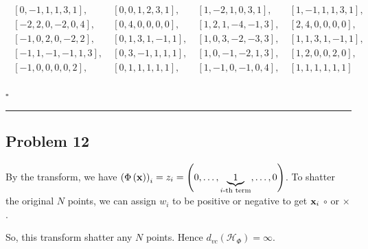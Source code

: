 \documentclass[12pt]{article}
\newcommand*{\QEDB}{\hfill\ensuremath{\square}}
\newcommand{\CBrackets}[1]{\left\{#1\right\}}
\newcommand{\ParTh}[1]{\left(#1\right)}
\newcommand{\BF}[1]{{\bf#1}}
\newcommand{\horrule}[1]{\rule{\linewidth}{#1}}
\begin{document}
\begin{align}
\begin{array}{llll}
\left[ 0, -1,  1,  1,  3,  1\right],~&\left[ 0,  0,  1,  2,  3,  1\right],~&\left[ 1, -2,  1,  0,  3,  1\right],~&\left[ 1, -1,  1,  1,  3,  1\right],\\
\left[-2,  2,  0, -2,  0,  4\right],~&\left[ 0,  4,  0,  0,  0,  0\right],~&\left[ 1,  2,  1, -4, -1,  3\right],~&\left[ 2,  4,  0,  0,  0,  0\right],\\
\left[-1,  0,  2,  0, -2,  2\right],~&\left[ 0,  1,  3,  1, -1,  1\right],~&\left[ 1,  0,  3, -2, -3,  3\right],~&\left[ 1,  1,  3,  1, -1,  1\right],\\
\left[-1,  1, -1, -1,  1,  3\right],~&\left[ 0,  3, -1,  1,  1,  1\right],~&\left[ 1,  0, -1, -2,  1,  3\right],~&\left[ 1,  2,  0,  0,  2,  0\right],\\
\left[-1,  0,  0,  0,  0,  2\right],~&\left[ 0,  1,  1,  1,  1,  1\right],~&\left[ 1, -1,  0, -1,  0,  4\right],~&\left[ 1,  1,  1,  1,  1,  1\right]
\end{array}
\end{align}

\QEDB

\horrule{0.5pt}

\subsection*{Problem 12}

By the transform, we have $\ParTh{\Phi\ParTh{\BF{x}}}_i=z_i=\ParTh{0,\ldots,\underbrace{1}_{i\text{-th term}},\ldots,0}$. To shatter the original $N$ points, we can assign $w_i$ to be positive or negative to get $\BF{x}_i$ $\circ$ or $\times$.

So, this transform shatter any $N$ points. Hence $d_{vc}\ParTh{\mathcal{H}_\Phi}=\infty$.
\end{document}
